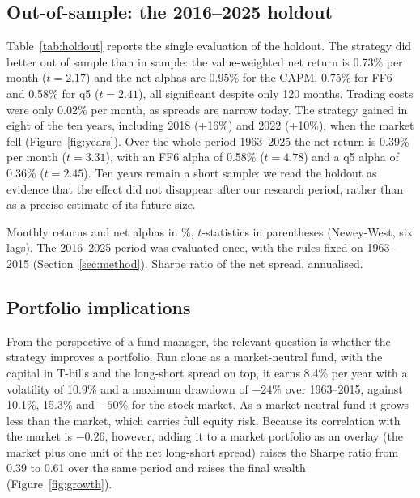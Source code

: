 \documentclass[12pt,a4paper]{article}
\newcommand{\tablenote}[1]{\par\vspace{4pt}\begin{minipage}{\linewidth}\footnotesize\singlespacing #1\end{minipage}}
\begin{document}
\subsection{Out-of-sample: the 2016--2025 holdout}\label{sec:holdout}

Table~\ref{tab:holdout} reports the single evaluation of the holdout. The strategy did better out of
sample than in sample: the value-weighted net return is 0.73\% per month ($t=2.17$) and the net
alphas are 0.95\% for the CAPM, 0.75\% for FF6 and 0.58\% for q5 ($t=2.41$), all significant despite
only 120 months. Trading costs were only 0.02\% per month, as spreads are narrow today. The strategy
gained in eight of the ten years, including 2018 (+16\%) and 2022 (+10\%), when the market fell
(Figure~\ref{fig:years}). Over the whole period 1963--2025 the net return is 0.39\% per month
($t=3.31$), with an FF6 alpha of 0.58\% ($t=4.78$) and a q5 alpha of 0.36\% ($t=2.45$). Ten years
remain a short sample: we read the holdout as evidence that the effect did not disappear after our
research period, rather than as a precise estimate of its future size.

\begin{table}[H]
\centering
\caption{The holdout period 2016--2025}\label{tab:holdout}

\tablenote{Monthly returns and net alphas in \%, $t$-statistics in parentheses (Newey-West, six lags).
The 2016--2025 period was evaluated once, with the rules fixed on 1963--2015
(Section~\ref{sec:method}). Sharpe ratio of the net spread, annualised.}
\end{table}

\subsection{Portfolio implications}\label{sec:portfolio}

From the perspective of a fund manager, the relevant question is whether the strategy improves a
portfolio. Run alone as a market-neutral fund, with the capital in T-bills and the long-short spread
on top, it earns 8.4\% per year with a volatility of 10.9\% and a maximum drawdown of $-24\%$ over
1963--2015, against 10.1\%, 15.3\% and $-50\%$ for the stock market. As a market-neutral fund it grows
less than the market, which carries full equity risk. Because its correlation with the market is
$-0.26$, however, adding it to a market portfolio as an overlay (the market plus one unit of the net
long-short spread) raises the Sharpe ratio from 0.39 to 0.61 over the same period and raises the
final wealth (Figure~\ref{fig:growth}).
\end{document}
